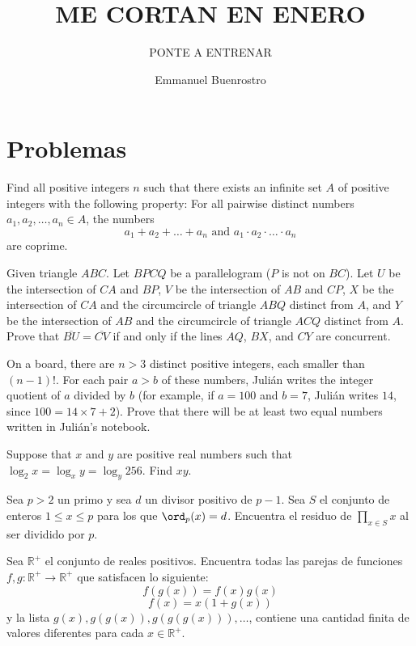 \documentclass[11pt]{scrartcl}
\title{ME CORTAN EN ENERO }
\subtitle{PONTE A ENTRENAR}
\author{Emmanuel Buenrostro}
\begin{document}
\maketitle

\section{Problemas}
\begin{problem}
Find all positive integers $n$ such that there exists an infinite set $A$ of positive integers with the following property: For all pairwise distinct numbers $a_1, a_2, \ldots , a_n \in A$, the numbers
$$a_1 + a_2 + \ldots + a_n \text{ and } a_1\cdot a_2\cdot \ldots\cdot a_n$$are coprime.
\end{problem}
\begin{problem}
Given triangle $ABC$. Let $BPCQ$ be a parallelogram ($P$ is not on $BC$). Let $U$ be the intersection of $CA$ and $BP$, $V$ be the intersection of $AB$ and $CP$, $X$ be the intersection of $CA$ and the circumcircle of triangle $ABQ$ distinct from $A$, and $Y$ be the intersection of $AB$ and the circumcircle of triangle $ACQ$ distinct from $A$.
Prove that $\overline{BU} = \overline{CV}$ if and only if the lines $AQ$, $BX$, and $CY$ are concurrent.
\end{problem}
\begin{problem}
On a board, there are $n > 3$ distinct positive integers, each smaller than $(n-1)!$. For each pair $a > b$ of these numbers, Julián writes the integer quotient of $a$ divided by $b$ (for example, if $a = 100$ and $b = 7$, Julián writes $14$, since $100 = 14 \times 7 + 2$). Prove that there will be at least two equal numbers written in Julián's notebook.
\end{problem}
\begin{problem}
 Suppose that $x$ and $y$ are positive real numbers such that $\log_2 x = \log_x y = \log_y 256$. Find $xy$.
\end{problem}
\begin{problem}
Sea $p>2$ un primo y sea $d$ un divisor positivo de $p-1$. Sea $S$ el conjunto de enteros $1 \leq x \leq p$ para los que $\ord_p(x)=d$. Encuentra el residuo de $\prod_{x \in S} x$ al ser dividido por $p$.
\end{problem}
\begin{problem}
Sea $\mathbb{R}^{+}$ el conjunto de reales positivos. Encuentra todas las parejas de funciones $f,g: \mathbb{R}^{+} \rightarrow \mathbb{R}^{+}$
que satisfacen lo siguiente: 
\[f(g(x))=f(x)g(x)\]
\[f(x)=x(1+g(x))\]
y la lista $g(x), g(g(x)), g(g(g(x))), \ldots$, contiene una cantidad finita de valores diferentes para cada $x\in \mathbb{R}^{+}$.
\end{problem}
\end{document}
